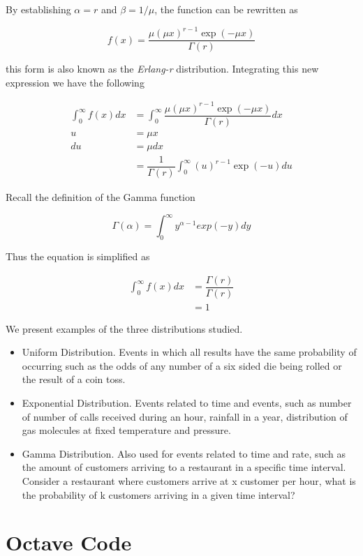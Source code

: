 \documentclass[a4paper,12pt]{article}
\begin{document}
By establishing $\alpha = r$ and $\beta = 1/ \mu$, the function can be rewritten as

\begin{equation}
 f(x) = \dfrac{\mu (\mu x)^{r-1} \exp(-\mu x)}{\Gamma(r)}
\end{equation}

this form is also known as the \emph{Erlang-r} distribution.
Integrating this new expression we have the following

\begin{align}
 \int_0^\infty f(x)dx &= \int_0^\infty \dfrac{\mu (\mu x)^{r-1} \exp(-\mu x)}{\Gamma(r)}dx\\
 u &= \mu x \\
 du &= \mu dx\\
 &= \dfrac{1}{\Gamma(r)} \int_0^\infty (u)^{r-1} \exp(-u) du
\end{align}

Recall the definition of the Gamma function

\begin{equation}
 \Gamma(\alpha) = \int_0^\infty y^{\alpha-1}exp(-y) dy
\end{equation}

Thus the equation is simplified as

\begin{align}
 \int_0^\infty f(x)dx &= \dfrac{\Gamma(r)}{\Gamma(r)}\\
 &= 1
\end{align}


We present examples of the three distributions studied.

\begin{itemize}
 \item Uniform Distribution. Events in which all results have the same probability of occurring such as the odds of any number of a six sided die being rolled or the result of a coin toss.
 \item Exponential Distribution. Events related to time and events, such as number of number of calls received during an hour, rainfall in a year, distribution of gas molecules at fixed temperature and pressure.
 \item Gamma Distribution. Also used for events related to time and rate, such as the amount of customers arriving to a restaurant in a specific time interval. Consider a restaurant where customers arrive at x customer per hour, what is the probability of k customers arriving in a given time interval?
\end{itemize}


\printbibliography

\pagebreak
\appendix
\section{Octave Code}

\end{document}
